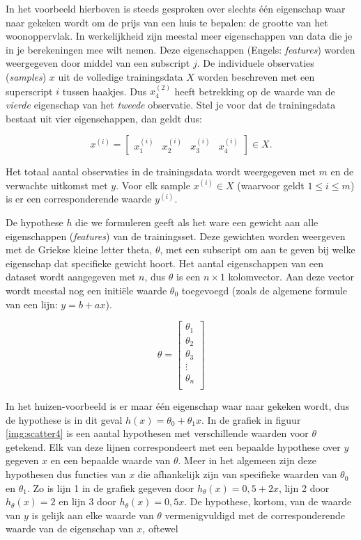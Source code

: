 In het voorbeeld hierboven is steeds gesproken over slechts één eigenschap waar naar gekeken wordt om de prijs van een huis te bepalen: de grootte van het woonoppervlak. In werkelijkheid zijn meestal meer eigenschappen van data die je in je berekeningen mee wilt nemen. Deze eigenschappen (Engels: \textit{features}) worden weergegeven door middel van een subscript $j$. De individuele observaties (\textit{samples}) $x$ uit de volledige trainingsdata $X$ worden beschreven met een superscript $i$ tussen haakjes. Dus $x_4^{(2)}$ heeft betrekking op de waarde van de \textit{vierde} eigenschap van het \textit{tweede} observatie. Stel je voor dat de trainingsdata bestaat uit vier eigenschappen, dan geldt dus:

\[
x^{(i)}  = 
\begin{bmatrix}
x_1^{(i)} & x_2^{(i)} & x_3^{(i)} & x_4^{(i)}
\end{bmatrix} \in X.
\]

Het totaal aantal observaties in de trainingsdata wordt weergegeven met $m$ en de verwachte uitkomst met $y$. Voor elk sample $x^{(i)} \in X$ (waarvoor geldt $1 \le i \le m$) is er een corresponderende waarde $y^{(i)}$.

De hypothese $h$ die we formuleren geeft als het ware een gewicht aan alle eigenschappen (\textit{features}) van de trainingsset. Deze gewichten worden weergeven met de Griekse kleine letter theta, $\theta$, met een subscript om aan te geven bij welke eigenschap dat specifieke gewicht hoort. Het aantal eigenschappen van een dataset wordt aangegeven met $n$, dus $\theta$ is een $n \times 1$ kolomvector. Aan deze vector wordt meestal nog een initiële waarde $\theta_0$ toegevoegd (zoals de algemene formule van een lijn: $y=b+ax$).

\[
\theta=
\begin{bmatrix}
\theta_1 \\
\theta_2 \\
\theta_3 \\
\vdots \\
\theta_n \\
\end{bmatrix}
\]



In het huizen-voorbeeld is er maar één eigenschap waar naar gekeken wordt, dus de hypothese is in dit geval $h(x) = \theta_0 + \theta_1x$. In de grafiek in figuur \ref{img:scatter4} is een aantal hypothesen met verschillende waarden voor $\theta$ getekend. Elk van deze lijnen correspondeert met een bepaalde hypothese over $y$ gegeven $x$ en een bepaalde waarde van $\theta$. Meer in het algemeen zijn deze hypothesen dus functies van $x$ die afhankelijk zijn van specifieke waarden van $\theta_0$ en $\theta_1$. Zo is lijn 1 in de grafiek gegeven door $h_\theta(x)=0,5+2x$, lijn 2 door $h_\theta(x)=2$ en lijn 3 door $h_\theta(x)=0,5x$. De hypothese, kortom, van de waarde van $y$ is gelijk aan elke waarde van $\theta$ vermenigvuldigd met de corresponderende waarde van de eigenschap van $x$, oftewel

